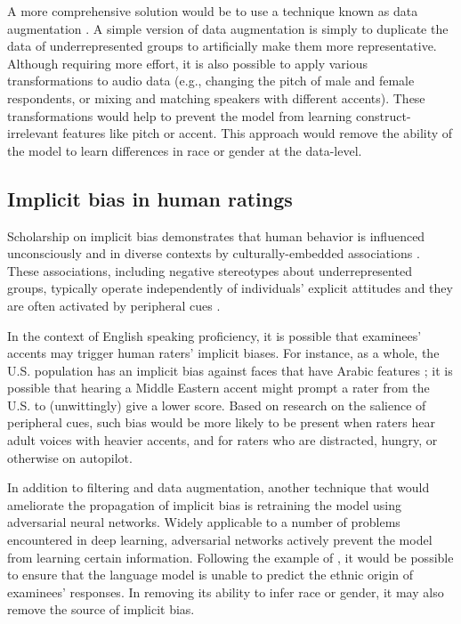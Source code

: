 \documentclass [PhD] {uclathes}
\begin{document}
A more comprehensive solution would be to use a technique known as data augmentation \citep[e.g.][]{zhao2018gender}. A simple version of data augmentation is simply to duplicate the data of underrepresented groups to artificially make them more representative. Although requiring more effort, it is also possible to apply various transformations to audio data (e.g., changing the pitch of male and female respondents, or mixing and matching speakers with different accents). These transformations would help to prevent the model from learning construct-irrelevant features like pitch or accent. This approach would remove the ability of the model to learn differences in race or gender at the data-level.

\subsection{Implicit bias in human ratings}

Scholarship on implicit bias demonstrates that human behavior is influenced unconsciously and in diverse contexts by culturally-embedded associations \citep{greenwald2006implicit}. These associations, including negative stereotypes about underrepresented groups, typically operate independently of individuals’ explicit attitudes \citep{karpinski2001attitudes} and they are often activated by peripheral cues \citep{spencer2016}.

In the context of English speaking proficiency, it is possible that examinees’ accents may trigger human raters’ implicit biases. For instance, as a whole, the U.S. population has an implicit bias against faces that have Arabic features \citep{park2007implicit}; it is possible that hearing a Middle Eastern accent might prompt a rater from the U.S. to (unwittingly) give a lower score. Based on research on the salience of peripheral cues, such bias would be more likely to be present when raters hear adult voices with heavier accents, and for raters who are distracted, hungry, or otherwise on autopilot.

In addition to filtering and data augmentation, another technique that would ameliorate the propagation of implicit bias is retraining the model using adversarial neural networks. Widely applicable to a number of problems encountered in deep learning, adversarial networks actively prevent the model from learning certain information. Following the example of \citet{zhang2018mitigating}, it would be possible to ensure that the language model is unable to predict the ethnic origin of examinees’ responses. In removing its ability to infer race or gender, it may also remove the source of implicit bias.
\end{document}
